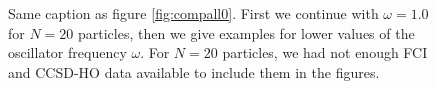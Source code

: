 \begin{figure}
\begin{center}
{}
\caption{Same caption as figure \ref{fig:compall0}. First we continue with $\omega=1.0$ for $N=20$ particles, then we give examples for lower values of the oscillator frequency $\omega$. For $N=20$ particles, we had not enough FCI and CCSD-HO data available to include them in the figures. }
\label{fig:compall1}
\end{center}
\end{figure}

